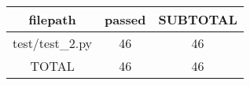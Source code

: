 \begin{tabular}{|c|c|c|}
\hline
filepath & passed & SUBTOTAL \\
\hline
test/test\_2.py & 46 & 46 \\
\hline
TOTAL & 46 & 46 \\
\hline
\end{tabular}
